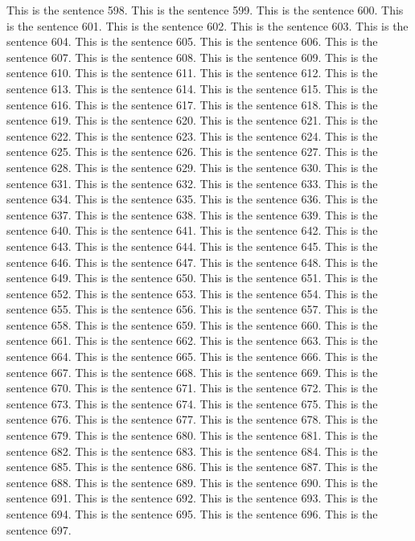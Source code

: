 \documentclass{article}
\begin{document}
This is the sentence 598.
This is the sentence 599.
This is the sentence 600.
This is the sentence 601.
This is the sentence 602.
This is the sentence 603.
This is the sentence 604.
This is the sentence 605.
This is the sentence 606.
This is the sentence 607.
This is the sentence 608.
This is the sentence 609.
This is the sentence 610.
This is the sentence 611.
This is the sentence 612.
This is the sentence 613.
This is the sentence 614.
This is the sentence 615.
This is the sentence 616.
This is the sentence 617.
This is the sentence 618.
This is the sentence 619.
This is the sentence 620.
This is the sentence 621.
This is the sentence 622.
This is the sentence 623.
This is the sentence 624.
This is the sentence 625.
This is the sentence 626.
This is the sentence 627.
This is the sentence 628.
This is the sentence 629.
This is the sentence 630.
This is the sentence 631.
This is the sentence 632.
This is the sentence 633.
This is the sentence 634.
This is the sentence 635.
This is the sentence 636.
This is the sentence 637.
This is the sentence 638.
This is the sentence 639.
This is the sentence 640.
This is the sentence 641.
This is the sentence 642.
This is the sentence 643.
This is the sentence 644.
This is the sentence 645.
This is the sentence 646.
This is the sentence 647.
This is the sentence 648.
This is the sentence 649.
This is the sentence 650.
This is the sentence 651.
This is the sentence 652.
This is the sentence 653.
This is the sentence 654.
This is the sentence 655.
This is the sentence 656.
This is the sentence 657.
This is the sentence 658.
This is the sentence 659.
This is the sentence 660.
This is the sentence 661.
This is the sentence 662.
This is the sentence 663.
This is the sentence 664.
This is the sentence 665.
This is the sentence 666.
This is the sentence 667.
This is the sentence 668.
This is the sentence 669.
This is the sentence 670.
This is the sentence 671.
This is the sentence 672.
This is the sentence 673.
This is the sentence 674.
This is the sentence 675.
This is the sentence 676.
This is the sentence 677.
This is the sentence 678.
This is the sentence 679.
This is the sentence 680.
This is the sentence 681.
This is the sentence 682.
This is the sentence 683.
This is the sentence 684.
This is the sentence 685.
This is the sentence 686.
This is the sentence 687.
This is the sentence 688.
This is the sentence 689.
This is the sentence 690.
This is the sentence 691.
This is the sentence 692.
This is the sentence 693.
This is the sentence 694.
This is the sentence 695.
This is the sentence 696.
This is the sentence 697.
\end{document}
